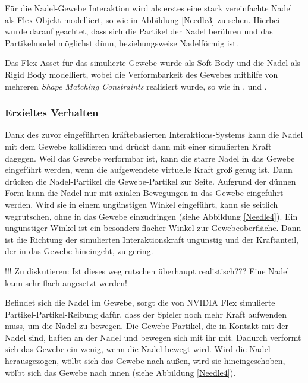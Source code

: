 Für die Nadel-Gewebe Interaktion wird als erstes eine stark vereinfachte Nadel als Flex-Objekt modelliert, so wie in Abbildung \ref{Needle3} zu sehen. Hierbei wurde darauf geachtet, dass sich die Partikel der Nadel berühren und das Partikelmodel möglichst dünn, beziehungsweise Nadelförmig ist.


Das Flex-Asset für das simulierte Gewebe wurde als Soft Body und die Nadel als Rigid Body modelliert, wobei die Verformbarkeit des Gewebes mithilfe von mehreren \textit{Shape Matching Constraints} realisiert wurde, so wie in \cite{UPP}, \cite{BreastBiopsy} und \cite{PBDKidney}. 

\subsubsection{Erzieltes Verhalten}
Dank des zuvor eingeführten kräftebasierten Interaktions-Systems kann die Nadel mit dem Gewebe kollidieren und drückt dann mit einer simulierten Kraft dagegen. 
Weil das Gewebe verformbar ist, kann die starre Nadel in das Gewebe eingeführt werden, wenn die aufgewendete virtuelle Kraft groß genug ist. Dann drücken die Nadel-Partikel die Gewebe-Partikel zur Seite. Aufgrund der dünnen Form kann die Nadel nur mit axialen Bewegungen in das Gewebe eingeführt werden. Wird sie in einem ungünstigen Winkel eingeführt, kann sie seitlich wegrutschen, ohne in das Gewebe einzudringen (siehe Abbildung \ref{Needle4}). Ein ungünstiger Winkel ist ein besonders flacher Winkel zur Gewebeoberfläche. Dann ist die Richtung der simulierten Interaktionskraft ungünstig und der Kraftanteil, der in das Gewebe hineingeht, zu gering.

!!! Zu diskutieren: Ist dieses weg rutschen überhaupt realistisch??? Eine Nadel kann sehr flach angesetzt werden!

Befindet sich die Nadel im Gewebe, sorgt die von NVIDIA Flex simulierte Partikel-Partikel-Reibung dafür, dass der Spieler noch mehr Kraft aufwenden muss, um die Nadel zu bewegen. Die Gewebe-Partikel, die in Kontakt mit der Nadel sind, haften an der Nadel und bewegen sich mit ihr mit. Dadurch verformt sich das Gewebe ein wenig, wenn die Nadel bewegt wird. Wird die Nadel herausgezogen, wölbt sich das Gewebe nach außen, wird sie hineingeschoben, wölbt sich das Gewebe nach innen (siehe Abbildung \ref{Needle4}).

